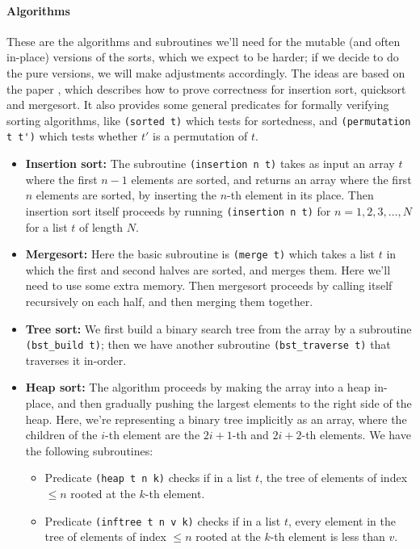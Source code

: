 \documentclass{article}
\begin{document}
\paragraph{Algorithms}
These are the algorithms and subroutines we'll need for the mutable (and often in-place) versions of the sorts, which we expect to be harder; if we decide to do the pure versions, we will make adjustments accordingly. The ideas are based on the paper \cite{filliatre1999certification}, which describes how to prove correctness for insertion sort, quicksort and mergesort. It also provides some general predicates for formally verifying sorting algorithms, like \verb|(sorted t)| which tests for sortedness, and \verb|(permutation t t')| which tests whether $t'$ is a permutation of $t$.
\begin{itemize}
  \item \textbf{Insertion sort:} The subroutine \verb|(insertion n t)| takes as input an array $t$ where the first $n-1$ elements are sorted, and returns an array where the first $n$ elements are sorted, by inserting the $n$-th element in its place. Then insertion sort itself proceeds by running \verb|(insertion n t)| for $n=1,2,3,\ldots,N$ for a list $t$ of length $N$. 
  \item \textbf{Mergesort:} Here the basic subroutine is \verb|(merge t)| which takes a list $t$ in which the first and second halves are sorted, and merges them. Here we'll need to use some extra memory. Then mergesort proceeds by calling itself recursively on each half, and then merging them together.
  \item \textbf{Tree sort:} We first build a binary search tree from the array by a subroutine \verb|(bst_build t)|; then we have another subroutine \verb|(bst_traverse t)| that traverses it in-order.
  \item \textbf{Heap sort:} The algorithm proceeds by making the array into a heap in-place, and then gradually pushing the largest elements to the right side of the heap. Here, we're representing a binary tree implicitly as an array, where the children of the $i$-th element are the $2i+1$-th and $2i+2$-th elements. We have the following subroutines:
  \begin{itemize}
	\item Predicate \verb|(heap t n k)| checks if in a list $t$, the tree of elements of index $\leq n$ rooted at the $k$-th element.
	\item Predicate \verb|(inftree t n v k)| checks if in a list $t$, every element in the tree of elements of index $\leq n$ rooted at the $k$-th element is less than $v$.

\end{itemize}
\end{itemize}
\end{document}
